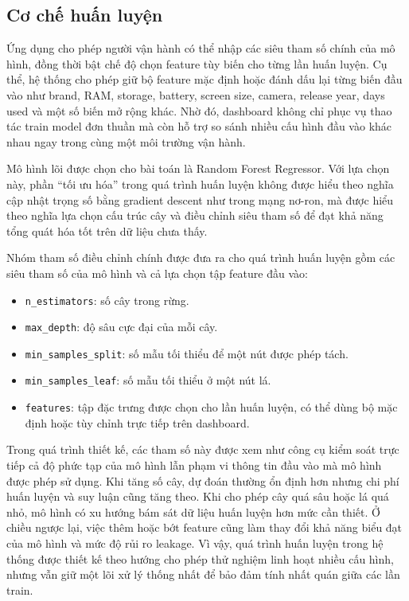 \subsection{Cơ chế huấn luyện}

Ứng dụng cho phép người vận hành có thể nhập các siêu tham số chính của mô hình, đồng thời bật chế độ chọn feature tùy biến cho từng lần huấn luyện. Cụ thể, hệ thống cho phép giữ bộ feature mặc định hoặc đánh dấu lại từng biến đầu vào như brand, RAM, storage, battery, screen size, camera, release year, days used và một số biến mở rộng khác. Nhờ đó, dashboard không chỉ phục vụ thao tác train model đơn thuần mà còn hỗ trợ so sánh nhiều cấu hình đầu vào khác nhau ngay trong cùng một môi trường vận hành.


Mô hình lõi được chọn cho bài toán là Random Forest Regressor. Với lựa chọn này, phần ``tối ưu hóa'' trong quá trình huấn luyện không được hiểu theo nghĩa cập nhật trọng số bằng gradient descent như trong mạng nơ-ron, mà được hiểu theo nghĩa lựa chọn cấu trúc cây và điều chỉnh siêu tham số để đạt khả năng tổng quát hóa tốt trên dữ liệu chưa thấy.

Nhóm tham số điều chỉnh chính được đưa ra cho quá trình huấn luyện gồm các siêu tham số của mô hình và cả lựa chọn tập feature đầu vào:

\begin{itemize}
    \item \texttt{n\_estimators}: số cây trong rừng.
    \item \texttt{max\_depth}: độ sâu cực đại của mỗi cây.
    \item \texttt{min\_samples\_split}: số mẫu tối thiểu để một nút được phép tách.
    \item \texttt{min\_samples\_leaf}: số mẫu tối thiểu ở một nút lá.
    \item \texttt{features}: tập đặc trưng được chọn cho lần huấn luyện, có thể dùng bộ mặc định hoặc tùy chỉnh trực tiếp trên dashboard.
\end{itemize}

Trong quá trình thiết kế, các tham số này được xem như công cụ kiểm soát trực tiếp cả độ phức tạp của mô hình lẫn phạm vi thông tin đầu vào mà mô hình được phép sử dụng. Khi tăng số cây, dự đoán thường ổn định hơn nhưng chi phí huấn luyện và suy luận cũng tăng theo. Khi cho phép cây quá sâu hoặc lá quá nhỏ, mô hình có xu hướng bám sát dữ liệu huấn luyện hơn mức cần thiết. Ở chiều ngược lại, việc thêm hoặc bớt feature cũng làm thay đổi khả năng biểu đạt của mô hình và mức độ rủi ro leakage. Vì vậy, quá trình huấn luyện trong hệ thống được thiết kế theo hướng cho phép thử nghiệm linh hoạt nhiều cấu hình, nhưng vẫn giữ một lõi xử lý thống nhất để bảo đảm tính nhất quán giữa các lần train.

